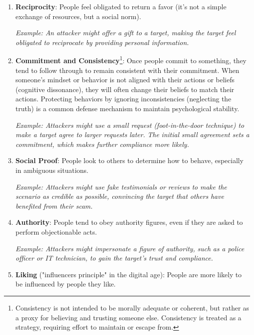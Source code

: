 \begin{enumerate}
    \item \textbf{Reciprocity}: People feel obligated to return a favor (it's not a simple exchange of resources, but a social norm).
    
    \hspace{1cm} \textit{Example: An attacker might offer a gift to a target, making the target feel obligated to reciprocate by providing personal information.}
    \item \textbf{Commitment and Consistency}\footnote{Consistency is not intended to be morally adequate or coherent, but rather as a proxy for believing and trusting someone else. Consistency is treated as a strategy, requiring effort to maintain or escape from. }: Once people commit to something, they tend to follow through to remain consistent with their commitment. When someone’s mindset or behavior is not aligned with their actions or beliefs (cognitive dissonance), they will often change their beliefs to match their actions. Protecting behaviors by ignoring inconsistencies (neglecting the truth) is a common defense mechanism to maintain psychological stability.

    \hspace{1cm} \textit{Example: Attackers might use a small request (foot-in-the-door technique) to make a target agree to larger requests later. The initial small agreement sets a commitment, which makes further compliance more likely.}

    \item \textbf{Social Proof}: People look to others to determine how to behave, especially in ambiguous situations.
    
    \hspace{1cm} \textit{Example: Attackers might use fake testimonials or reviews to make the scenario as credible as possible, convincing the target that others have benefited from their scam.}
    
    \item \textbf{Authority}: People tend to obey authority figures, even if they are asked to perform objectionable acts.
    
    \hspace{1cm} \textit{Example: Attackers might impersonate a figure of authority, such as a police officer or IT technician, to gain the target's trust and compliance.}

    \item \textbf{Liking} ("influencers principle" in the digital age): People are more likely to be influenced by people they like.
    

\end{enumerate}
